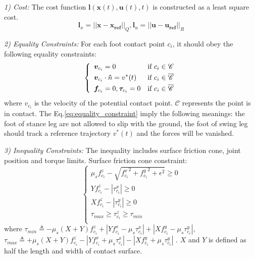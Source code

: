 \documentclass[a4paper, 10pt, conference]{ieeeconf}      %
\begin{document}
\textit{1) Cost:}
The cost function $\bm{l}(\bm{x}(t), \bm{u}(t), t)$ is constructed as a least square cost.
\begin{equation}
    \bm{l}_x = ||\bm{x} - \bm{x_{ref}}||_Q, \bm{l}_u = ||\bm{u} - \bm{u_{ref}}||_R
\end{equation}

\textit{2) Equality Constraints:}
For each foot contact point $c_i$, it should obey the following equality constraints:
\begin{equation}
    \label{eq:equality_constraint}
    \left\{\begin{array}{l} 
    \begin{split}
         &\bm{v}_{c_i} = 0  & \text{if} \ c_i \in \mathscr{C}\\
         &\bm{v}_{c_i} \cdot \bm{\hat}{n} = v^*(t) &  \text{if} \ c_i \in \overline{\mathscr{C}}\\ 
         &\bm{f}_{c_i} = 0, \bm{\tau}_{c_i} = 0 & \text{if} \ c_i \in \overline{\mathscr{C}} \\
    \end{split}
    \end{array}\right.
\end{equation}
where $v_{c_i}$ is the velocity of the potential contact point. $\mathscr{C}$ represents the point is in contact. The Eq.\ref{eq:equality_constraint} imply the following meanings: the foot of stance leg are not allowed to slip with the ground, the foot of swing leg should track a reference trajectory $v^*(t)$ and the forces will be vanished.

\textit{3) Inequality Constraints:} The inequality includes surface friction cone, joint position and torque limits.
Surface friction cone constraint: 
\begin{equation}
\left\{\begin{array}{l} 
    \mu_{s} f^z_{c_i} - \sqrt{{f^x_{c_i}}^2 + {f^y_{c_i}}^2 + \epsilon^2} \ge 0 \\
    Yf_{c_i}^z - |\tau_{c_i}^x| \ge 0 \\
    Xf_{c_i}^z - |\tau_{c_i}^y| \ge 0 \\
    \tau_{max} \ge \tau_{c_i}^z \ge \tau_{min} \\
    \end{array}\right.
\end{equation}
where $\tau_{min} \triangleq -\mu_s(X+Y)f_{c_i}^z + |Yf_{c_i}^x - \mu_s \tau_{c_i}^x| + |Xf_{c_i}^y - \mu_s \tau_{c_i}^y|$, $\tau_{max} \triangleq + \mu_s(X+Y)f_{c_i}^z - |Yf_{c_i}^x + \mu_s \tau_{c_i}^x| - |Xf_{c_i}^y + \mu_s \tau_{c_i}^y|$ \cite{c36}. $X$ and $Y$ is defined as half the length and width of contact surface.
\end{document}

